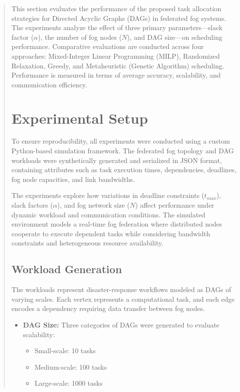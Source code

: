 \documentclass[conference]{IEEEtran}
\begin{document}
\begin{abstract}
This section evaluates the performance of the proposed task allocation strategies for Directed Acyclic Graphs (DAGs) in federated fog systems. The experiments analyze the effect of three primary parameters—slack factor ($\alpha$), the number of fog nodes ($N$), and DAG size—on scheduling performance. Comparative evaluations are conducted across four approaches: Mixed-Integer Linear Programming (MILP), Randomized Relaxation, Greedy, and Metaheuristic (Genetic Algorithm) scheduling. Performance is measured in terms of average accuracy, scalability, and communication efficiency.

\section{Experimental Setup}

To ensure reproducibility, all experiments were conducted using a custom Python-based simulation framework. The federated fog topology and DAG workloads were synthetically generated and serialized in JSON format, containing attributes such as task execution times, dependencies, deadlines, fog node capacities, and link bandwidths.

The experiments explore how variations in deadline constraints ($t_{max}$), slack factors ($\alpha$), and fog network size ($N$) affect performance under dynamic workload and communication conditions. The simulated environment models a real-time fog federation where distributed nodes cooperate to execute dependent tasks while considering bandwidth constraints and heterogeneous resource availability.

\subsection{Workload Generation}

The workloads represent disaster-response workflows modeled as DAGs of varying scales. Each vertex represents a computational task, and each edge encodes a dependency requiring data transfer between fog nodes.

\begin{itemize}
    \item \textbf{DAG Size:}  
    Three categories of DAGs were generated to evaluate scalability:
    \begin{itemize}
        \item Small-scale: 10 tasks
        \item Medium-scale: 100 tasks
        \item Large-scale: 1000 tasks
    \end{itemize}


\end{itemize}
\end{abstract}
\end{document}
